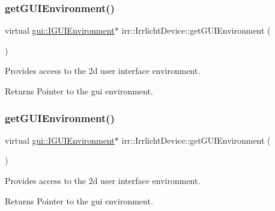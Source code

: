 \subsubsection{\texorpdfstring{get\+G\+U\+I\+Environment()}{getGUIEnvironment()}\hspace{0.1cm}{\footnotesize\ttfamily [1/3]}}
{\footnotesize\ttfamily virtual \hyperlink{classirr_1_1gui_1_1IGUIEnvironment}{gui\+::\+I\+G\+U\+I\+Environment}$\ast$ irr\+::\+Irrlicht\+Device\+::get\+G\+U\+I\+Environment (\begin{DoxyParamCaption}{ }\end{DoxyParamCaption})\hspace{0.3cm}{\ttfamily [pure virtual]}}



Provides access to the 2d user interface environment. 

\begin{DoxyReturn}{Returns}
Pointer to the gui environment. 
\end{DoxyReturn}
\mbox{\label{classirr_1_1IrrlichtDevice_af7491b8c5ef4f71360f30fbad90ae35c}} 
\subsubsection{\texorpdfstring{get\+G\+U\+I\+Environment()}{getGUIEnvironment()}\hspace{0.1cm}{\footnotesize\ttfamily [2/3]}}
{\footnotesize\ttfamily virtual \hyperlink{classirr_1_1gui_1_1IGUIEnvironment}{gui\+::\+I\+G\+U\+I\+Environment}$\ast$ irr\+::\+Irrlicht\+Device\+::get\+G\+U\+I\+Environment (\begin{DoxyParamCaption}{ }\end{DoxyParamCaption})\hspace{0.3cm}{\ttfamily [pure virtual]}}



Provides access to the 2d user interface environment. 

\begin{DoxyReturn}{Returns}
Pointer to the gui environment. 
\end{DoxyReturn}
\mbox{\label{classirr_1_1IrrlichtDevice_af7491b8c5ef4f71360f30fbad90ae35c}} 
